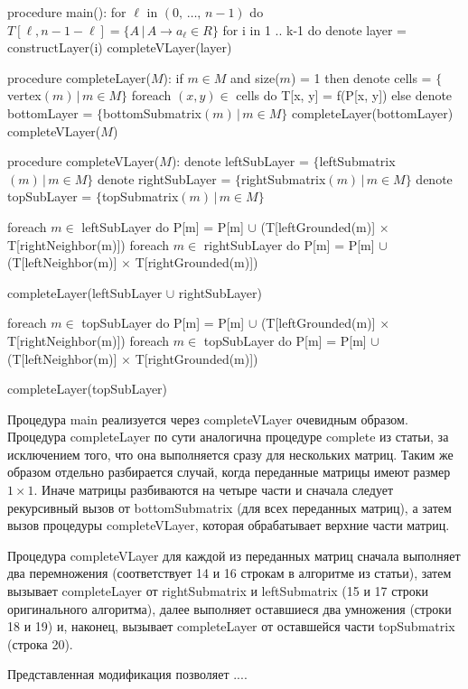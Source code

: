 \documentclass[12pt]{article}  %
\theoremstyle{definition}
\theoremstyle{remark}
\begin{document}
\begin{algorithm}[caption={Algorithm.}, label={main}]
procedure main():
  for $\ell$ in $(0,\,\dots,\,n-1)$ do
    $T[\ell, n-1-\ell] = \{A\,|\,A \to a_{\ell} \in R\}$
  for i in 1 .. k-1 do
    denote layer = constructLayer(i)
    completeVLayer(layer)  

procedure completeLayer($M$):
  if $m \in M$ and size($m$) = 1 then
    denote cells = $\{$vertex$(m)\,|\, m \in M\}$
    foreach $(x, y) \in $ cells do
      T[x, y] = f(P[x, y])
  else
    denote bottomLayer = $\{$bottomSubmatrix$(m)\,|\,m \in M\}$
    completeLayer(bottomLayer)
    completeVLayer($M$)     

procedure completeVLayer($M$):
  denote leftSubLayer = $\{$leftSubmatrix$(m)\,|\,m \in M\}$
  denote rightSubLayer = $\{$rightSubmatrix$(m)\,|\,m \in M\}$
  denote topSubLayer = $\{$topSubmatrix$(m)\,|\,m \in M\}$

  foreach $m \in$ leftSubLayer do
    P[m] = P[m] $\cup$ (T[leftGrounded(m)] $\times$ T[rightNeighbor(m)])
  foreach $m \in$ rightSubLayer do
    P[m] = P[m] $\cup$ (T[leftNeighbor(m)] $\times$ T[rightGrounded(m)])

  completeLayer(leftSubLayer $\cup$ rightSubLayer)

  foreach $m \in$ topSubLayer do
    P[m] = P[m] $\cup$ (T[leftGrounded(m)] $\times$ T[rightNeighbor(m)])
  foreach $m \in$ topSubLayer do
    P[m] = P[m] $\cup$ (T[leftNeighbor(m)] $\times$ T[rightGrounded(m)])

  completeLayer(topSubLayer)  
\end{algorithm}

Процедура main реализуется через completeVLayer очевидным образом. Процедура completeLayer по сути аналогична процедуре complete из статьи, за исключением того, что она выполняется сразу для нескольких матриц. Таким же образом отдельно разбирается случай, когда переданные матрицы имеют размер $1 \times 1$. Иначе матрицы разбиваются на четыре части и сначала следует рекурсивный вызов от bottomSubmatrix (для всех переданных матриц), а затем вызов процедуры completeVLayer, которая обрабатывает верхние части матриц. 

Процедура completeVLayer для каждой из переданных матриц сначала выполняет два перемножения (соответствует 14 и 16 строкам в алгоритме из статьи), затем вызывает completeLayer от rightSubmatrix и leftSubmatrix (15 и 17 строки оригинального алгоритма), далее выполняет оставшиеся два умножения (строки 18 и 19) и, наконец, вызывает completeLayer от оставшейся части topSubmatrix (строка 20).


Представленная модификация позволяет ....
\end{document}

